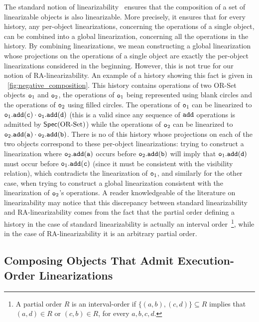 The standard notion of linearizability~\cite{HerlihyW90} ensures that the composition of a set of linearizable objects is also linearizable. More precisely, it ensures that for every history, any per-object linearizations, concerning the operations of a single object, can be combined into a global linearization, concerning all the operations in the history. By combining linearizations, we mean constructing a global linearization whose projections on the operations of a single object are exactly the per-object linearizations considered in the beginning.
However, this is not true for our notion of RA-linearizability. An example of a history showing this fact is given in \figureautorefname~\ref{fig:negative_composition}. This history contains operations of two OR-Set objects $\mathtt{o}_1$ and $\mathtt{o}_2$, the operations of $\mathtt{o}_1$ being represented using blank circles and the operations of $\mathtt{o}_2$ using filled circles. The operations of $\mathtt{o}_1$ can be linearized to $\aobj_1.\alabelshort[{\tt add}]{c}\cdot \aobj_1.\alabelshort[{\tt add}]{d}$ (this is a valid \crdtlinearization{} since any sequence of ${\tt add}$ operations is admitted by $\mathsf{Spec}(\text{OR\text{-}Set})$) while the operations of $\mathtt{o}_2$ can be linearized to $\aobj_2.\alabelshort[{\tt add}]{a}\cdot \aobj_2.\alabelshort[{\tt add}]{b}$. There is no \crdtlinearization{} of this history whose projections on each of the two objects correspond to these per-object linearizations: trying to construct a linearization where $\aobj_2.\alabelshort[{\tt add}]{a}$ occurs before $\aobj_2.\alabelshort[{\tt add}]{b}$ will imply that $\aobj_1.\alabelshort[{\tt add}]{d}$ must occur before $\aobj_1.\alabelshort[{\tt add}]{c}$ (since it must be consistent with the visibility relation), which contradicts the linearization of $\mathtt{o}_1$, and similarly for the other case, when trying to construct a global linearization consistent with the linearization of $\mathtt{o}_2$'s operations. A reader knowledgeable of the literature on linearizability may notice that this discrepancy between standard linearizability and RA-linearizability comes from the fact that the partial order defining a history in the case of standard linearizability is actually an interval order~\footnote{A partial order $R$ is an interval-order if $\{(a,b), (c,d)\} \subseteq R$ implies that $(a,d) \in R$ or $(c,b) \in R$, for every $a,b,c,d$.}, while in the case of RA-linearizability it is an arbitrary partial order.


\subsection{Composing Objects That Admit Execution-Order Linearizations}


